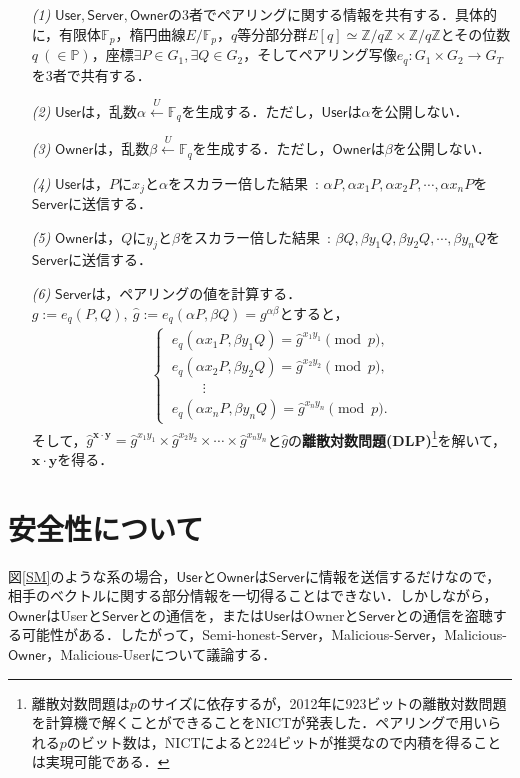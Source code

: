 \documentclass[a4paper]{jsarticle}
\newcommand{\user}{\textsf{User}}
\newcommand{\owner}{\textsf{Owner}}
\begin{document}
\begin{enumerate}
\item[\it{(1)}] $\mathsf{User},\mathsf{Server},\mathsf{Owner}$の3者でペアリングに関する情報を共有する．具体的に，有限体$\mathbb{F}_p$，楕円曲線$E/\mathbb{F}_p$，$q$等分部分群$E[q]\simeq \mathbb{Z}/q\mathbb{Z}\times \mathbb{Z}/q\mathbb{Z}$とその位数$q\ (\in \mathbb{P})$，座標$\exists P\in G_1,\exists Q\in G_2$，そしてペアリング写像$e_q:G_1\times G_2 \rightarrow G_T$を3者で共有する．
\item[\it{(2)}] $\mathsf{User}$は，乱数$\alpha \overset{U}{\leftarrow}\mathbb{F}_q $を生成する．ただし，$\mathsf{User}$は$\alpha$を公開しない．
\item[\it{(3)}] $\mathsf{Owner}$は，乱数$\beta \overset{U}{\leftarrow}\mathbb{F}_q $を生成する．ただし，$\mathsf{Owner}$は$\beta$を公開しない．
\item[\it{(4)}]$\mathsf{User}$は，$P$に$x_j$と$\alpha$をスカラー倍した結果\ : $\alpha P,\alpha x_1 P, \alpha x_2 P,\cdots, \alpha x_n P$を$\mathsf{Server}$に送信する．

\item[\it{(5)}]$\mathsf{Owner}$は，$Q$に$y_j$と$\beta$をスカラー倍した結果\ : $\beta Q,\beta y_1 Q, \beta y_2 Q,\cdots, \beta y_n Q$を$\mathsf{Server}$に送信する．
\item[\it{(6)}]$\mathsf{Server}$は，ペアリングの値を計算する．$g:=e_q(P,Q), \ \hat{g}:=e_q(\alpha P,\beta Q) = g^{\alpha\beta}$とすると，
\begin{align}
\begin{cases}
\ e_q(\alpha x_1 P,\beta y_1 Q) = \hat{g}^{x_1y_1} \pmod{p},\\
\ e_q(\alpha x_2 P,\beta y_2 Q) = \hat{g}^{x_2y_2} \pmod{p},\\
\ \ \ \ \ \ \ \ \ \ \ \vdots\\
\ e_q(\alpha  x_n P,\beta y_n Q) = \hat{g}^{x_ny_n}\pmod{p}.
\end{cases}
\end{align}
そして，$\hat{g}^{\bm{x}\cdot\bm{y}} = \hat{g}^{x_1y_1}\times\hat{g}^{x_2y_2}\times \cdots \times \hat{g}^{x_ny_n}$と$\hat{g}$の\textbf{離散対数問題(DLP)}\footnote{離散対数問題は$p$のサイズに依存するが，2012年に923ビットの離散対数問題を計算機で解くことができることをNICTが発表した．ペアリングで用いられる$p$のビット数は，NICTによると224ビットが推奨なので内積を得ることは実現可能である．}を解いて，$\bm{x}\cdot\bm{y}$を得る．
\end{enumerate}

\section{安全性について}
図\ref{SM}のような系の場合，$\mathsf{User}$と$\mathsf{Owner}$は$\mathsf{Server}$に情報を送信するだけなので，相手のベクトルに関する部分情報を一切得ることはできない．しかしながら，$\mathsf{Owner}$は\user と$\mathsf{Server}$との通信を，または$\mathsf{User}$は\owner と$\mathsf{Server}$との通信を盗聴する可能性がある．したがって，Semi-honest-$\mathsf{Server}$，Malicious-$\mathsf{Server}$，Malicious-$\mathsf{Owner}$，Malicious-\user について議論する．
\end{document}
